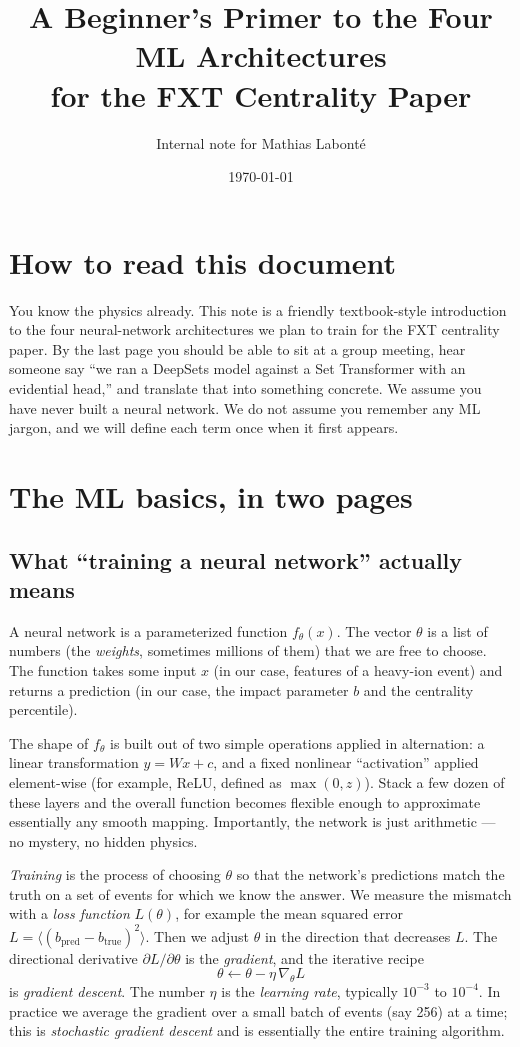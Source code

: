 \documentclass[11pt]{article}
\title{A Beginner's Primer to the Four ML Architectures \\
       for the FXT Centrality Paper}
\author{Internal note for Mathias Labonté}
\date{\today}
\begin{document}
\maketitle

\section*{How to read this document}

You know the physics already. This note is a friendly textbook-style
introduction to the four neural-network architectures we plan to train
for the FXT centrality paper. By the last page you should be able to
sit at a group meeting, hear someone say ``we ran a DeepSets model
against a Set Transformer with an evidential head,'' and translate that
into something concrete. We assume you have never built a neural
network. We do not assume you remember any ML jargon, and we will
define each term once when it first appears.

\section{The ML basics, in two pages}

\subsection{What ``training a neural network'' actually means}

A neural network is a parameterized function $f_\theta(x)$. The vector
$\theta$ is a list of numbers (the \emph{weights}, sometimes millions
of them) that we are free to choose. The function takes some input $x$
(in our case, features of a heavy-ion event) and returns a prediction
(in our case, the impact parameter $b$ and the centrality percentile).

The shape of $f_\theta$ is built out of two simple operations applied
in alternation: a linear transformation $y = Wx + c$, and a fixed
nonlinear ``activation'' applied element-wise (for example, ReLU,
defined as $\max(0, z)$). Stack a few dozen of these layers and the
overall function becomes flexible enough to approximate essentially
any smooth mapping. Importantly, the network is just arithmetic --- no
mystery, no hidden physics.

\emph{Training} is the process of choosing $\theta$ so that the
network's predictions match the truth on a set of events for which we
know the answer. We measure the mismatch with a \emph{loss function}
$L(\theta)$, for example the mean squared error
$L = \langle (b_{\text{pred}} - b_{\text{true}})^2 \rangle$. Then we
adjust $\theta$ in the direction that decreases $L$. The directional
derivative $\partial L / \partial \theta$ is the \emph{gradient}, and
the iterative recipe
\[
   \theta \leftarrow \theta - \eta \, \nabla_\theta L
\]
is \emph{gradient descent}. The number $\eta$ is the
\emph{learning rate}, typically $10^{-3}$ to $10^{-4}$. In practice we
average the gradient over a small batch of events (say 256) at a time;
this is \emph{stochastic gradient descent} and is essentially the
entire training algorithm.
\end{document}
